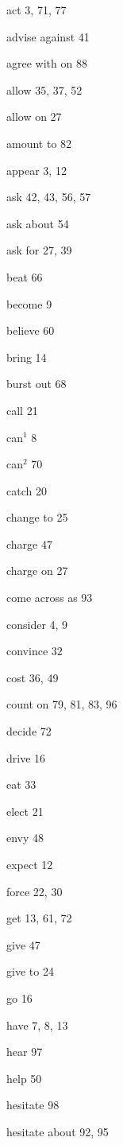 \begin{theindex}
\item act  3, 71, 77
\item advise against 41 
\item agree with on  88
\item allow  35, 37, 52
\item allow on  27 
\item amount to  82
\item appear  3, 12
\item ask  42, 43, 56, 57
\item ask about 54
\item ask for  27, 39
\item beat  66
\item become  9 
\item believe  60 
\item bring  14 
\item burst out  68
\item call  21 
\item can$^{1}$  8 
\item can$^{2}$  70
\item catch  20 
\item change to  25
\item charge  47 
\item charge on  27 
\item come across as  93
\item consider  4, 9
\item convince  32 
\item cost  36, 49
\item count on  79, 81, 83, 96
\item decide  72
\item drive  16 
\item eat  33 
\item elect  21 
\item envy  48 
\item expect  12 
\item force  22, 30
\item get  13, 61, 72
\item give 47
\item give to  24
\item go 16
\item have 7, 8, 13
\item hear  97
\item help  50 
\item hesitate  98
\item hesitate about  92, 95

\end{theindex}
